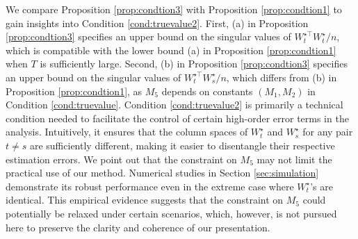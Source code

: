 \documentclass[12pt]{article}
\newcommand{\blue}[1]{\textcolor{blue}{#1}}
\newcommand{\red}[1]{\textcolor{red}{#1}}
\newcommand{\mytrans}{\top}
\begin{document}
We compare Proposition \ref{prop:condtion3} with Proposition \ref{prop:condtion1} to gain insights into Condition \ref{cond:truevalue2}. 
First, (a) in Proposition \ref{prop:condtion3} specifies an upper bound on the singular values of $W_t^{\star\top}W_t^{\star}/n$, which is compatible with the lower bound (a) in Proposition \ref{prop:condtion1} when $T$ is sufficiently large. 
Second, (b) in Proposition \ref{prop:condtion3} specifies an upper bound on the singular values of $W_t^{\star\mytrans} W_s^{\star}/n$, which differs from (b) in Proposition  \ref{prop:condtion1}, as $M_5$ depends on  constants $(M_1,M_2)$ in Condition \ref{cond:truevalue}. 
Condition \ref{cond:truevalue2} is primarily a technical condition needed  to facilitate the control of  certain high-order error terms in the analysis. 
Intuitively, it ensures that the column spaces of  $W_t^{\star}$ and $W_s^{\star}$  for any pair $t\neq  s$ are sufficiently different, making it easier to disentangle their respective estimation errors. 
{We point out that the constraint on $M_5$ may not limit the practical use of our method.  Numerical studies in Section \ref{sec:simulation} demonstrate its robust  performance even in the extreme case where  $W_t^{\star}$'s are identical. 
This empirical evidence suggests that the constraint on $M_5$ could potentially be relaxed under certain scenarios, which, however, is not pursued here to preserve the clarity and coherence of our presentation.} 



\end{document}
